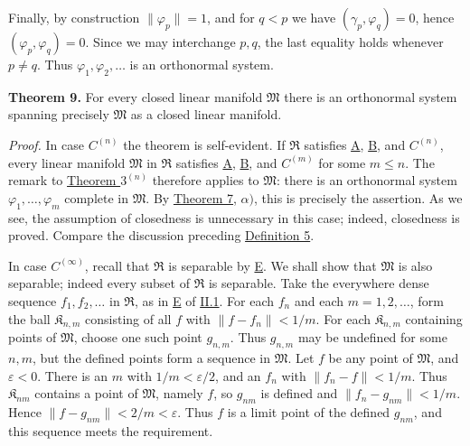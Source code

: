 \documentclass[fontsize=13pt,twoside,openany,headings=normal,parskip=false,bookmarkpackage=false,DIV=calc]{scrbook}
\begin{document}
Finally, by construction $\|\varphi_p\|=1$, and for $q<p$ we have $(\gamma_p,\varphi_q)=0$, hence $(\varphi_p,\varphi_q)=0$. Since we may interchange $p,q$, the last equality holds whenever $p\ne q$. Thus $\varphi_1,\varphi_2,\ldots$ is an orthonormal system.

\leavevmode{}\textbf{Theorem 9.}\label{thm:II.9} For every closed linear manifold $\mathfrak{M}$ there is an orthonormal system spanning precisely $\mathfrak{M}$ as a closed linear manifold.

\hypertarget{origpage-30}{}%
\emph{Proof.} In case \hyperref[ax:II.Cn]{$C^{(n)}$} the theorem is self-evident. If $\mathfrak{R}$ satisfies \hyperref[ax:II.A]{A}, \hyperref[ax:II.B]{B}, and \hyperref[ax:II.Cn]{$C^{(n)}$}, every linear manifold $\mathfrak{M}$ in $\mathfrak{R}$ satisfies \hyperref[ax:II.A]{A}, \hyperref[ax:II.B]{B}, and \hyperref[ax:II.Cn]{$C^{(m)}$} for some $m\leq n$. The remark to \hyperref[thm:II.3n]{Theorem $3^{(n)}$} therefore applies to $\mathfrak{M}$: there is an orthonormal system $\varphi_1,\ldots,\varphi_m$ complete in $\mathfrak{M}$. By \hyperref[thm:II.7]{Theorem 7}, $\alpha)$, this is precisely the assertion. As we see, the assumption of closedness is unnecessary in this case; indeed, closedness is proved. Compare the discussion preceding \hyperref[def:II.5]{Definition 5}.

In case \hyperref[ax:II.Cinfty]{$C^{(\infty)}$}, recall that $\mathfrak{R}$ is separable by \hyperref[ax:II.E]{E}. We shall show that $\mathfrak{M}$ is also separable; indeed every subset of $\mathfrak{R}$ is separable. Take the everywhere dense sequence $f_1,f_2,\ldots$ in $\mathfrak{R}$, as in \hyperref[ax:II.E]{E} of \hyperref[sec:II.1]{II.1}. For each $f_n$ and each $m=1,2,\ldots$, form the ball $\mathfrak{K}_{n,m}$ consisting of all $f$ with $\|f-f_n\|<1/m$. For each $\mathfrak{K}_{n,m}$ containing points of $\mathfrak{M}$, choose one such point $g_{n,m}$. Thus $g_{n,m}$ may be undefined for some $n,m$, but the defined points form a sequence in $\mathfrak{M}$. Let $f$ be any point of $\mathfrak{M}$, and $\varepsilon<0$. There is an $m$ with $1/m<\varepsilon/2$, and an $f_n$ with $\|f_n-f\|<1/m$. Thus $\mathfrak{K}_{nm}$ contains a point of $\mathfrak{M}$, namely $f$, so $g_{nm}$ is defined and $\|f_n-g_{nm}\|<1/m$. Hence $\|f-g_{nm}\|<2/m<\varepsilon$. Thus $f$ is a limit point of the defined $g_{nm}$, and this sequence meets the requirement.
\end{document}
